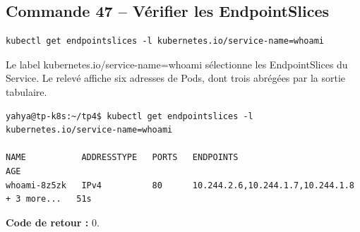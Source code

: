 \documentclass[11pt,a4paper]{article}
\begin{document}
\subsection{Commande 47 -- Vérifier les EndpointSlices}
\begin{lstlisting}
kubectl get endpointslices -l kubernetes.io/service-name=whoami
\end{lstlisting}
Le label kubernetes.io/service-name=whoami sélectionne les EndpointSlices du Service. Le relevé affiche six adresses de Pods, dont trois abrégées par la sortie tabulaire.
\begin{tcolorbox}[terminal,title={Ubuntu / WSL2 -- Commande 47 -- rendu reconstitué}]
\begin{Verbatim}[fontsize=\scriptsize,breaklines=true,breakanywhere=true,breaksymbolleft={},breaksymbolright={}]
yahya@tp-k8s:~/tp4$ kubectl get endpointslices -l kubernetes.io/service-name=whoami

NAME           ADDRESSTYPE   PORTS   ENDPOINTS                                      AGE
whoami-8z5zk   IPv4          80      10.244.2.6,10.244.1.7,10.244.1.8 + 3 more...   51s
\end{Verbatim}
\end{tcolorbox}
\textbf{Code de retour :} 0.
\end{document}

